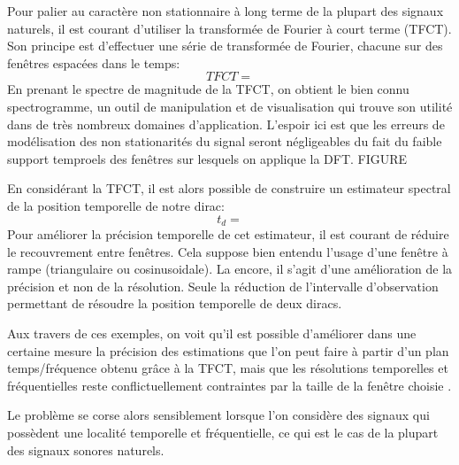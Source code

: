 Pour palier au caractère non stationnaire à long terme de la plupart des signaux naturels, il est courant d'utiliser la transformée de Fourier à court terme (TFCT). Son principe est d'effectuer une série de transformée de Fourier, chacune sur des fenêtres espacées dans le temps:
\begin{equation}
TFCT =
\end{equation}
En prenant le spectre de magnitude de la TFCT, on obtient le bien connu spectrogramme, un outil de manipulation et de visualisation qui trouve son utilité dans de très nombreux domaines d'application. L'espoir ici est que les erreurs de modélisation des non stationarités du signal seront négligeables du fait du faible support temproels des fenêtres sur lesquels on applique la DFT.  FIGURE

En considérant la TFCT, il est alors possible de construire un estimateur \og spectral \fg de la position temporelle de notre dirac:
\begin{equation}
t_d =
\end{equation}
Pour améliorer la précision temporelle de cet estimateur, il est courant de réduire le recouvrement entre fenêtres. Cela suppose bien entendu l'usage d'une fenêtre \og à rampe \fg (triangulaire ou cosinusoidale). La encore, il s'agit d'une amélioration de la précision et non de la résolution. Seule la réduction de l'intervalle d'observation permettant de résoudre la position temporelle de deux diracs.

Aux travers de ces exemples, on voit qu'il est possible d'améliorer dans une certaine mesure la précision des estimations que l'on peut faire à partir d'un plan temps/fréquence obtenu grâce à la TFCT, mais que les résolutions temporelles et fréquentielles reste conflictuellement contraintes par la taille de la fenêtre choisie .

Le problème se corse alors sensiblement lorsque l'on considère des signaux qui possèdent une localité temporelle et fréquentielle, ce qui est le cas de la plupart des signaux sonores naturels.


